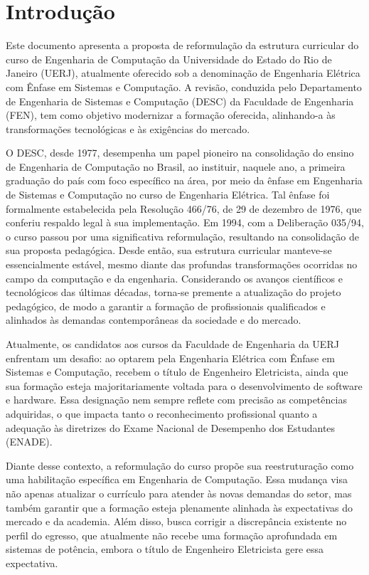 \chapter{Introdução}
\label{intro} %

Este documento apresenta a proposta de reformulação da estrutura curricular do curso de Engenharia de Computação da Universidade do Estado do Rio de Janeiro (UERJ), atualmente oferecido sob a denominação de Engenharia Elétrica com Ênfase em Sistemas e Computação. A revisão, conduzida pelo Departamento de Engenharia de Sistemas e Computação (DESC) da Faculdade de Engenharia (FEN), tem como objetivo modernizar a formação oferecida, alinhando-a às transformações tecnológicas e às exigências do mercado.

O DESC, desde 1977, desempenha um papel pioneiro na consolidação do ensino de Engenharia de Computação no Brasil, ao instituir, naquele ano, a primeira graduação do país com foco específico na área, por meio da ênfase em Engenharia de Sistemas e Computação no curso de Engenharia Elétrica. Tal ênfase foi formalmente estabelecida pela Resolução  466/76, de 29 de dezembro de 1976, que conferiu respaldo legal à sua implementação. Em 1994, com a Deliberação  035/94, o curso passou por uma significativa reformulação, resultando na consolidação de sua proposta pedagógica. Desde então, sua estrutura curricular manteve-se essencialmente estável, mesmo diante das profundas transformações ocorridas no campo da computação e da engenharia. Considerando os avanços científicos e tecnológicos das últimas décadas, torna-se premente a atualização do projeto pedagógico, de modo a garantir a formação de profissionais qualificados e alinhados às demandas contemporâneas da sociedade e do mercado.

Atualmente, os candidatos aos cursos da Faculdade de Engenharia da UERJ enfrentam um desafio: ao optarem pela Engenharia Elétrica com Ênfase em Sistemas e Computação, recebem o título de Engenheiro Eletricista, ainda que sua formação esteja majoritariamente voltada para o desenvolvimento de software e hardware. Essa designação nem sempre reflete com precisão as competências adquiridas, o que impacta tanto o reconhecimento profissional quanto a adequação às diretrizes do Exame Nacional de Desempenho dos Estudantes (ENADE).

Diante desse contexto, a reformulação do curso propõe sua reestruturação como uma habilitação específica em Engenharia de Computação. Essa mudança visa não apenas atualizar o currículo para atender às novas demandas do setor, mas também garantir que a formação esteja plenamente alinhada às expectativas do mercado e da academia. Além disso, busca corrigir a discrepância existente no perfil do egresso, que atualmente não recebe uma formação aprofundada em sistemas de potência, embora o título de Engenheiro Eletricista gere essa expectativa.

